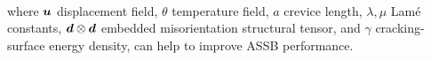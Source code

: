 \documentclass[25pt, a0paper,
portrait,
margin=2mm, 
innermargin=2mm, 
blockverticalspace=7mm, %
colspace=2mm, %
subcolspace=0mm]{tikzposter}
\makeatletter
\newcommand*{\inputfig}[3][htb]{{
    \def\fps@figure{#1}
    \def\DIR{#2}
    \def\LABEL{#3}
    \graphicspath{{\DIR/}}
    
}}
\makeatother
\begin{document}
{\begin{minipage}{0.56\textwidth}
\begin{mdframed}
\begin{align*}
			\end{align*}
			where 
			${\boldsymbol{\mathnormal u}}$ displacement field, 
			$\theta$ temperature field, 
			$a$ crevice length,
			$\lambda, \mu$ Lam\'{e} constants,
			${\boldsymbol{\mathnormal d}}\otimes{\boldsymbol{\mathnormal d}}$ embedded misorientation structural tensor,
			and 
			$\gamma$ cracking-surface energy density,
			can help to improve ASSB performance.
		\end{mdframed}
	\end{minipage}%
	\hfill
	\begin{minipage}{0.44\textwidth}
		\begin{center}
			\inputfig{floats/routine_woTV_spectral}{routine_woTV_spectral}
		\end{center}
	\end{minipage}
	\vspace{-0.3cm}
}
\end{document}
